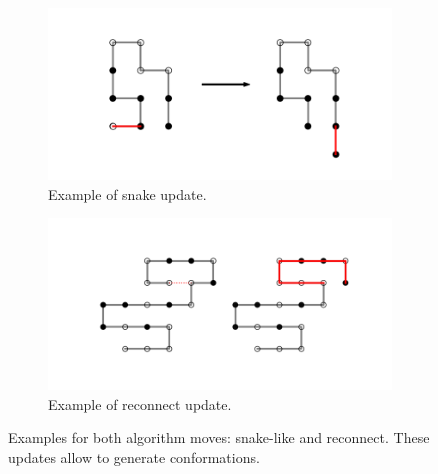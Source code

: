   \begin{figure}
	\centering
	\begin{subfigure}[b]{0.45\textwidth}
		\includegraphics[width=\textwidth]{Images/snakeupdate.png}
		\caption{ Example of snake update. } 
		\label{fig:snake}
	\end{subfigure}
	\begin{subfigure}[b]{0.45\textwidth}
		\includegraphics[width=\textwidth]{Images/reconnect.png}
		\caption{  Example of reconnect update. }
		\label{fig:reconnect}
	\end{subfigure}
	\caption{ Examples for both algorithm moves: snake-like and reconnect. These updates allow to generate conformations.   }
	\label{fig:UpdateSaw}
\end{figure}
 
